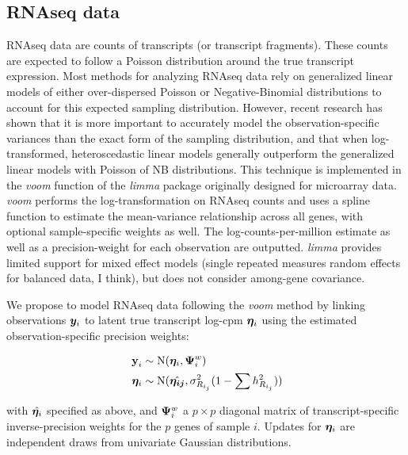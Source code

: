 \documentclass[11pt]{amsart}
\newcommand*{\B}[1]{\ifmmode\bm{#1}\else\textbf{#1}\fi}
\begin{document}
\subsection{RNAseq data}
RNAseq data are counts of transcripts (or transcript fragments). These counts are expected to follow a Poisson distribution around the true transcript expression. Most methods for analyzing RNAseq data rely on generalized linear models of either over-dispersed Poisson or Negative-Binomial distributions to account for this expected sampling distribution. However, recent research has shown that it is more important to accurately model the observation-specific variances than the exact form of the sampling distribution, and that when log-transformed, heteroscedastic linear models generally outperform the generalized linear models with Poisson of NB distributions. This technique is implemented in the \emph{voom} function of the \emph{limma} package originally designed for microarray data. \emph{voom} performs the log-transformation on RNAseq counts and uses a spline function to estimate the mean-variance relationship across all genes, with optional sample-specific weights as well. The log-counts-per-million estimate as well as a precision-weight for each observation are outputted. \emph{limma} provides limited support for mixed effect models (single repeated measures random effects for balanced data, I think), but does not consider among-gene covariance.

We propose to model RNAseq data following the \emph{voom} method by linking observations $\B{y}_i$ to latent true transcript log-cpm $\B{\eta}_i$ using the estimated observation-specific precision weights:

\begin{align} \begin{split}
\B{y}_i &\sim \mbox{N}(\B{\eta}_i, \B{\Psi}^w_i) \\
\;\B{\eta}_i &\sim \mbox{N}(\hat{\B{\eta_{ij}}},\sigma^2_{R_{i_j}}(1-\sum h^2_{R_{i_j}}))
\end{split}\end{align}

\noindent with $\hat{\B{\eta}_i}$ specified as above, and $\B{\Psi}^w_i$ a $p \times p$ diagonal matrix of transcript-specific inverse-precision weights for the $p$ genes of sample $i$. Updates for $\B{\eta}_i$ are independent draws from univariate Gaussian distributions.
\end{document}
